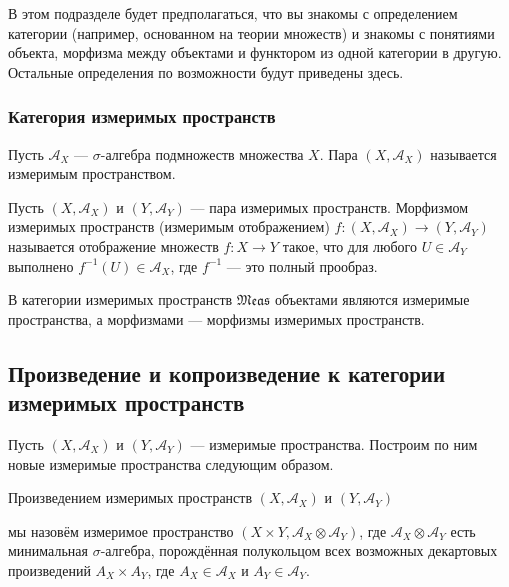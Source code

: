 \documentclass[12pt]{article}
\numberwithin{theorem}{section}
\theoremstyle{definition}
\newcommand{\calA}{\mathcal{A}}
\newcommand{\defin}[2]{\hypertarget{#2}{{\color{red} #1}}}
\newcommand{\Meas}{\mathfrak{Meas}}
\begin{document}
	В этом подразделе будет предполагаться, что вы знакомы с определением категории 
	(например, основанном на теории множеств) и знакомы с понятиями объекта, морфизма между объектами и функтором из одной категории в другую. Остальные определения по возможности будут приведены здесь.
	
	\subsubsection{Категория измеримых пространств}
	
	Пусть $ \calA_X $ --- $ \sigma $-алгебра подмножеств множества $ X $.
	Пара $ (X, \calA_X) $ называется \defin{измеримым пространством}{measurable-space}.
	
	Пусть $ (X, \calA_X) $ и $ (Y, \calA_Y) $ --- пара измеримых пространств.
	\defin{Морфизмом измеримых пространств (измеримым отображением)}{morphism-of-measurable-spaces} 
	$ f \colon (X, \calA_X) \to (Y, \calA_Y) $ называется отображение
	множеств $ f \colon X \to Y $ такое, что для любого $ U \in \calA_Y $ выполнено $ f^{-1}(U) \in \calA_X $,
	где $ f^{-1} $ --- это полный прообраз.
	
	В категории измеримых пространств $ \Meas $ объектами являются измеримые пространства, а морфизмами
	--- морфизмы измеримых пространств.
	
	\subsection{Произведение и копроизведение к категории измеримых пространств}
	
	Пусть $ (X, \calA_X) $ и $ (Y, \calA_Y) $ --- измеримые пространства.
	Построим по ним новые измеримые пространства следующим образом.
	
	\defin{Произведением измеримых пространств $ (X, \calA_X) $ и $ (Y, \calA_Y) $}{product-of-measurable-spaces}
	мы назовём измеримое пространство $ (X \times Y, \calA_X \otimes \calA_Y) $,
	где $ \calA_X \otimes \calA_Y $ есть минимальная $ \sigma $-алгебра, порождённая полукольцом
	всех возможных декартовых произведений $ A_X \times A_Y $,
	где $ A_X \in \calA_X $ и $ A_Y \in \calA_Y $.
	
\end{document}
